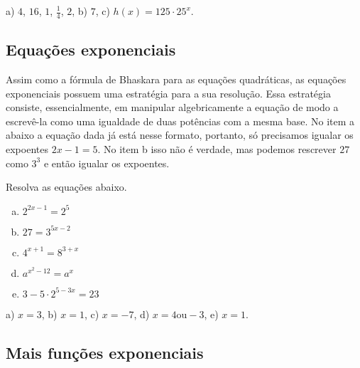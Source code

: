 \documentclass[main.tex]{subfiles}
\begin{document}
\begin{gabarito}
	\begin{gabaritoQuestao}
		a) $4$, $16$, $1$, $\frac{1}{4}$, $2$, b) $7$, c) $h(x)=125 \cdot 25^x$.
	\end{gabaritoQuestao}
\end{gabarito}


\subsection*{Equações exponenciais}

Assim como a fórmula de Bhaskara para as equações quadráticas, as equações exponenciais possuem uma estratégia para a sua resolução. Essa estratégia consiste, essencialmente, em manipular algebricamente a equação de modo a escrevê-la como uma igualdade de duas potências com a mesma base. No item a abaixo a equação dada já está nesse formato, portanto, só precisamos igualar os expoentes $2x-1=5$. No item b isso não é verdade, mas podemos rescrever $27$ como $3^3$ e então igualar os expoentes.

\begin{questao}
 Resolva as equações abaixo.
\begin{enumerate}[a)]
\item $2^{2x-1} = 2^5$
\item $27 = 3^{5x-2}$
\item $4^{x+1}=8^{3+x}$
\item $a^{x^2-12}=a^{x}$
\item $3-5 \cdot 2^{5-3x} = 23$
\end{enumerate}
\end{questao}

\begin{gabarito}
	\begin{gabaritoQuestao}
		a) $x=3$, b) $x=1$, c) $x=-7$, d) $x=4 \text{ou} -3$, e) $x=1$.
	\end{gabaritoQuestao}
\end{gabarito}



\subsection*{Mais funções exponenciais}
\end{document}
